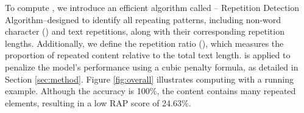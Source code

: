 %
%
To compute \rap, we introduce an efficient algorithm called \alg -- Repetition Detection Algorithm--designed to identify all repeating patterns, including non-word character (\nwc) and text repetitions, along with their corresponding repetition lengths. Additionally, we define the repetition ratio (\rr), which measures the proportion of repeated content relative to the total text length. \rr is applied to penalize the model’s performance using a cubic penalty formula, as detailed in Section \ref{sec:method}. Figure \ref{fig:overall} illustrates computing \rap with a running example. 
Although the accuracy is 100\%, the content contains many repeated elements, resulting in a low RAP score of 24.63\%.


